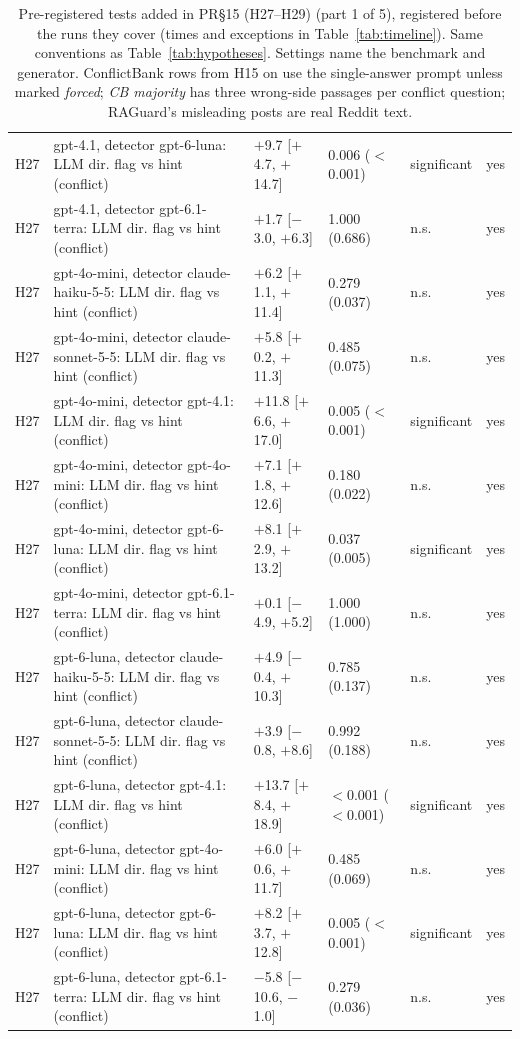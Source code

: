 \begin{table}[p]
{\begin{tabular}{lp{6.6cm}llll}
H27 & gpt-4.1, detector gpt-6-luna: LLM dir. flag vs hint (conflict) & $+$9.7 [$+$4.7, $+$14.7] & 0.006 ($<$0.001) & significant & yes \\
H27 & gpt-4.1, detector gpt-6.1-terra: LLM dir. flag vs hint (conflict) & $+$1.7 [$-$3.0, $+$6.3] & 1.000 (0.686) & n.s. & yes \\
H27 & gpt-4o-mini, detector claude-haiku-5-5: LLM dir. flag vs hint (conflict) & $+$6.2 [$+$1.1, $+$11.4] & 0.279 (0.037) & n.s. & yes \\
H27 & gpt-4o-mini, detector claude-sonnet-5-5: LLM dir. flag vs hint (conflict) & $+$5.8 [$+$0.2, $+$11.3] & 0.485 (0.075) & n.s. & yes \\
H27 & gpt-4o-mini, detector gpt-4.1: LLM dir. flag vs hint (conflict) & $+$11.8 [$+$6.6, $+$17.0] & 0.005 ($<$0.001) & significant & yes \\
H27 & gpt-4o-mini, detector gpt-4o-mini: LLM dir. flag vs hint (conflict) & $+$7.1 [$+$1.8, $+$12.6] & 0.180 (0.022) & n.s. & yes \\
H27 & gpt-4o-mini, detector gpt-6-luna: LLM dir. flag vs hint (conflict) & $+$8.1 [$+$2.9, $+$13.2] & 0.037 (0.005) & significant & yes \\
H27 & gpt-4o-mini, detector gpt-6.1-terra: LLM dir. flag vs hint (conflict) & $+$0.1 [$-$4.9, $+$5.2] & 1.000 (1.000) & n.s. & yes \\
H27 & gpt-6-luna, detector claude-haiku-5-5: LLM dir. flag vs hint (conflict) & $+$4.9 [$-$0.4, $+$10.3] & 0.785 (0.137) & n.s. & yes \\
H27 & gpt-6-luna, detector claude-sonnet-5-5: LLM dir. flag vs hint (conflict) & $+$3.9 [$-$0.8, $+$8.6] & 0.992 (0.188) & n.s. & yes \\
H27 & gpt-6-luna, detector gpt-4.1: LLM dir. flag vs hint (conflict) & $+$13.7 [$+$8.4, $+$18.9] & $<$0.001 ($<$0.001) & significant & yes \\
H27 & gpt-6-luna, detector gpt-4o-mini: LLM dir. flag vs hint (conflict) & $+$6.0 [$+$0.6, $+$11.7] & 0.485 (0.069) & n.s. & yes \\
H27 & gpt-6-luna, detector gpt-6-luna: LLM dir. flag vs hint (conflict) & $+$8.2 [$+$3.7, $+$12.8] & 0.005 ($<$0.001) & significant & yes \\
H27 & gpt-6-luna, detector gpt-6.1-terra: LLM dir. flag vs hint (conflict) & $-$5.8 [$-$10.6, $-$1.0] & 0.279 (0.036) & n.s. & yes \\
\bottomrule
\end{tabular}}
\caption{Pre-registered tests added in PR\S15 (H27--H29) (part 1 of 5), registered before the runs they cover (times and exceptions in
Table~\ref{tab:timeline}). Same conventions as
Table~\ref{tab:hypotheses}. Settings name the benchmark and generator. ConflictBank rows from H15 on use the
single-answer prompt unless marked \emph{forced}; \emph{CB majority} has three wrong-side passages per conflict
question; RAGuard's misleading posts are real Reddit text.}
\label{tab:hypotheses11}
\end{table}

